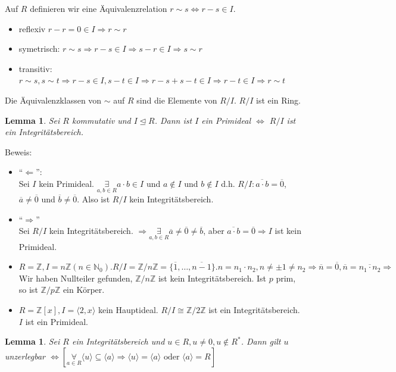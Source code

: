\documentclass{article}
\newtheorem{lemma}[thm]{Lemma}
\newcommand{\N}{\mathbb{N}}
\newcommand{\Z}{\mathbb{Z}}
\begin{document}
Auf $R$ definieren wir eine Äquivalenzrelation
$r\sim s\Leftrightarrow r-s\in I$.
\begin{itemize}
    \item reflexiv $r-r=0\in I\Rightarrow r\sim r$
    \item symetrisch: $r\sim s\Rightarrow r-s\in I
        \Rightarrow s-r\in I\Rightarrow s\sim r$
    \item transitiv:
        $r\sim s,s\sim t\Rightarrow r-s\in I,s-t\in I
        \Rightarrow r-s+s-t\in I\Rightarrow r-t\in I
        \Rightarrow r\sim t$
\end{itemize}
Die Äquivalenzklassen von $\sim$ auf $R$ sind
die Elemente von $R/I$. $R/I$ ist ein Ring.
\color{black}
\begin{lemma}
    Sei $R$ kommutativ und $I\unlhd R$. Dann ist
    $I$ ein Primideal $\Leftrightarrow$ $R/I$ ist
    ein Integritätsbereich.
\end{lemma}
Beweis:
\begin{itemize}
    \item ``$\Leftarrow$'':\\
        Sei $I$ kein Primideal.
        $\underset{a,b\in R}\exists a\cdot b\in I$
        und $a\notin I$ und $b\notin I$ d.h.
        $R/I:\overline{a\cdot b}=\overline{0}$,
        $\overline{a}\neq\overline{0}$
        und $\overline{b}\neq\overline{0}$. Also
        ist $R/I$ kein Integritätsbereich.
    \item ``$\Rightarrow$''\\
    Sei $R/I$ kein Integritätsbereich. $\Rightarrow
    \underset{a,b\in R}\exists\overline{a}\neq\overline{0}
    \neq\overline{b}$, aber $\overline{a\cdot b}=
    \overline{0}\Rightarrow I$ ist kein Primideal.
\end{itemize}
\color{purple}
\begin{itemize}
    \item
        $R=\Z,I=n\Z(n\in\N_0).R/I=\Z/n\Z=\{\overline{1},\hdots,
        \overline{n-1}\}.n=n_1\cdot n_2,n\neq\pm 1\neq n_2
        \Rightarrow\overline{n}=\overline{0},\overline{n}=
        \overline{n_1\cdot n_2}\Rightarrow$ Wir
        haben Nullteiler gefunden, $\Z/n\Z$ ist kein
        Integritätsbereich.
        Ist $p$ prim, so ist $\Z/p\Z$ ein Körper.
    \item
        $R=\Z[x],I=\langle2,x\rangle$ kein Hauptideal.
        $R/I\cong \Z/2\Z$ ist ein Integritätsbereich.
        $I$ ist ein Primideal.
\end{itemize}
\color{black}
\begin{lemma}
    Sei $R$ ein Integritätsbereich und $u\in R,u\neq 0,
    u\notin R^*$. Dann gilt $u$ unzerlegbar
    $\Leftrightarrow\left[\underset{a\in R}\forall
    \langle u\rangle\subseteq\langle a\rangle\Rightarrow
    \langle u\rangle=\langle a\rangle\text{ oder }\langle a
    \rangle=R\right]$
\end{lemma}
\end{document}
